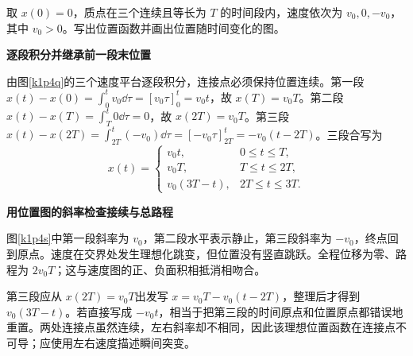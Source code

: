 \begin{question}\begin{example}[由分段速度重建位置图]\label{k1p4}
取 $x(0)=0$，质点在三个连续且等长为 $T$ 的时间段内，速度依次为 $v_0,0,-v_0$，其中 $v_0>0$。写出位置函数并画出位置随时间变化的图。\end{example}
\end{question}
\begin{solution}\textbf{逐段积分并继承前一段末位置}\par\nobreak
由图\ref{k1p4q}的三个速度平台逐段积分，连接点必须保持位置连续。第一段 $x(t)-x(0)=\int_0^t v_0\dd\tau=[v_0\tau]_0^t=v_0t$，故 $x(T)=v_0T$。第二段 $x(t)-x(T)=\int_T^t0\dd\tau=0$，故 $x(2T)=v_0T$。第三段 $x(t)-x(2T)=\int_{2T}^t(-v_0)\dd\tau=[-v_0\tau]_{2T}^t=-v_0(t-2T)$。三段合写为
\[x(t)=\begin{cases}v_0t,&0\le t\le T,\\v_0T,&T\le t\le2T,\\v_0(3T-t),&2T\le t\le3T.\end{cases}\]


\par\medskip{}\noindent\textbf{用位置图的斜率检查接续与总路程}\par\nobreak
图\ref{k1p4s}中第一段斜率为 $v_0$，第二段水平表示静止，第三段斜率为 $-v_0$，终点回到原点。速度在交界处发生理想化跳变，但位置没有竖直跳跃。全程位移为零、路程为 $2v_0T$；这与速度图的正、负面积相抵消相吻合。

第三段应从 $x(2T)=v_0T$出发写 $x=v_0T-v_0(t-2T)$，整理后才得到 $v_0(3T-t)$。若直接写成 $-v_0t$，相当于把第三段的时间原点和位置原点都错误地重置。两处连接点虽然连续，左右斜率却不相同，因此该理想位置函数在连接点不可导；应使用左右速度描述瞬间突变。\end{solution}


